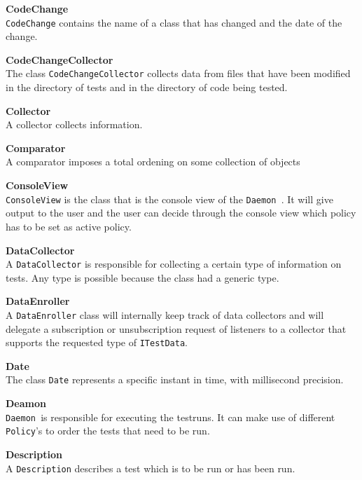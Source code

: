 \documentclass[i2]{oss}
\newcommand{\class}[1]{\texttt{#1}}
\newcommand{\Deamon}{\class{Daemon  }}
\newcommand{\gloss}[1]{\textbf{#1}}
\begin{document}
\begin{description}
\item \gloss{CodeChange}\\
\class{CodeChange} contains the name of a class that has changed and the date of the change.

\item \gloss{CodeChangeCollector}\\
The class \class{CodeChangeCollector} collects data from files that have been modified in the directory of tests and in the directory of code being tested. 
	

\item \gloss{Collector}\\
A collector collects information.

\item \gloss{Comparator}\\
A comparator imposes a total ordening on some collection of objects

\item \gloss{ConsoleView}\\
\class{ConsoleView} is the class that is the console view of the \Deamon. It will give output to the user and the user can decide through the console view which policy has to be set as active policy.

\item \gloss{DataCollector}\\
A \class{DataCollector} is responsible for collecting a certain type of information on tests. Any type is possible because the class had a generic type.

\item \gloss{DataEnroller}\\
A \class{DataEnroller} class will internally keep track of data collectors and will delegate a subscription or unsubscription request of listeners to a collector that supports the requested type of \class{ITestData}.

\item \gloss{Date}\\
The class \class{Date} represents a specific instant in time, with millisecond precision.

\item \gloss{Deamon} \\
	\Deamon is responsible for executing the testruns. It can make use of different \class{Policy}'s to order the tests that need to be run.

\item \gloss{Description} \\ A \class{Description} describes a test which is to be run or has been run. 


\end{description}
\end{document}
